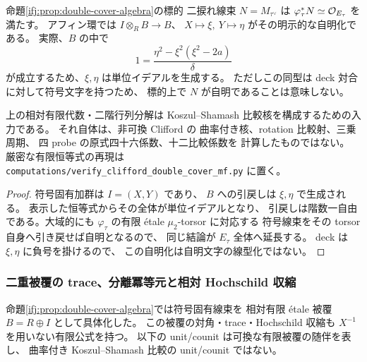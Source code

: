 \begin{corollary}[標的符号線束の自明化と残る降下文字]
\label{ifj:cor:double-cover-sign-descent}
命題\ref{ifj:prop:double-cover-algebra}の標的
二捩れ線束 $N=M_{\tau^\vee}$ は
$\varphi_\tau^*N\simeq\mathcal O_{E_\tau}$ を満たす。
アフィン環では $I\otimes_RB\to B$、
$X\mapsto\xi,\ Y\mapsto\eta$ がその明示的な自明化である。
実際、$B$ の中で
\[
 1=\frac{\eta^2-\xi^2(\xi^2-2a)}{\delta}
\]
が成立するため、$\xi,\eta$ は単位イデアルを生成する。
ただしこの同型は deck 対合に対して符号文字を持つため、
標的上で $N$ が自明であることは意味しない。

上の相対有限代数・二階行列分解は
Koszul--Shamash 比較核を構成するための入力である。
それ自体は、非可換 Clifford の
曲率付き核、rotation 比較射、三乗周期、
四 probe の原式四十六係数、十二比較係数を
計算したものではない。
厳密な有限恒等式の再現は
\texttt{computations/verify\_clifford\_double\_cover\_mf.py}
に置く。
\end{corollary}

\begin{proof}
符号固有加群は $I=(X,Y)$ であり、
$B$ への引戻しは $\xi,\eta$ で生成される。
表示した恒等式からその全体が単位イデアルとなり、
引戻しは階数一自由である。大域的にも
$\varphi_\tau$ の有限 \'{e}tale $\mu_2$-torsor に対応する
符号線束をその torsor 自身へ引き戻せば自明となるので、
同じ結論が $E_\tau$ 全体へ延長する。
deck は $\xi,\eta$ に負号を掛けるので、
この自明化は自明文字の線型化ではない。
\end{proof}

\subsubsection{二重被覆の trace、分離冪等元と相対 Hochschild 収縮}
\label{ifj:subsubsec:cover-trace-casimir}

命題\ref{ifj:prop:double-cover-algebra}では符号固有線束を
相対有限 \'{e}tale 被覆 $B=R\oplus I$ として具体化した。
この被覆の対角・trace・Hochschild 収縮も
$X^{-1}$ を用いない有限公式を持つ。
以下の unit/counit は可換な有限被覆の随伴を表し、
曲率付き Koszul--Shamash 比較の unit/counit ではない。

